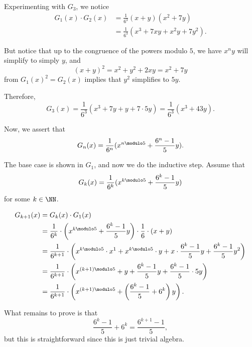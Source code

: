 \begin{enumerate}
          Experimenting with \(G_3\), we notice
          \begin{align*}
              G_1(x) \cdot G_2(x) & = \frac{1}{6^3} (x + y)(x^2 + 7y)          \\
                                  & = \frac{1}{6^3} (x^3 + 7xy + x^2y + 7y^2).
          \end{align*}

          But notice that up to the congruence of the powers modulo \(5\), we have \(x^n y\) will simplify to simply \(y\), and
          \[
              (x + y)^2 = x^2 + y^2 + 2xy = x^2 + 7y
          \]
          from \(G_1(x)^2 = G_2(x)\) implies that \(y^2\) simplifies to \(5y\).

          Therefore,
          \[
              G_3(x) = \frac{1}{6^3} (x^3 + 7y + y + 7 \cdot 5y) = \frac{1}{6^3} (x^3 + 43y).
          \]

          Now, we assert that
          \[
              G_n(x) = \frac{1}{6^n} (x^{n \modulo 5} + \frac{6^n - 1}{5}y).
          \]

          The base case is shown in \(G_1\), and now we do the inductive step. Assume that
          \[
              G_k(x) = \frac{1}{6^k} (x^{k \modulo 5} + \frac{6^k - 1}{5}y)
          \]
          for some \(k \in \NN\).

          \begin{align*}
              G_{k + 1}(x) & = G_k(x) \cdot G_1(x)                                                                                                                               \\
                           & = \frac{1}{6^k} \cdot \left(x^{k \modulo 5} + \frac{6^k - 1}{5}y\right) \cdot \frac{1}{6} \cdot (x + y)                                             \\
                           & = \frac{1}{6^{k + 1}} \cdot \left(x^{k \modulo 5} \cdot x^{1} + x^{k \modulo 5} \cdot y + x \cdot \frac{6^k - 1}{5}y + \frac{6^k - 1}{5} y^2\right) \\
                           & = \frac{1}{6^{k + 1}} \cdot \left(x^{(k + 1) \modulo 5} + y + \frac{6^k - 1}{5}y + \frac{6^k - 1}{5} \cdot 5 y\right)                               \\
                           & = \frac{1}{6^{k + 1}} \cdot \left(x^{(k + 1) \modulo 5} + \left(\frac{6^k - 1}{5} + 6^k\right)y\right).
          \end{align*}

          What remains to prove is that
          \[
              \frac{6^k - 1}{5} + 6^k = \frac{6^{k + 1} - 1}{5},
          \]
          but this is straightforward since this is just trivial algebra.


\end{enumerate}

